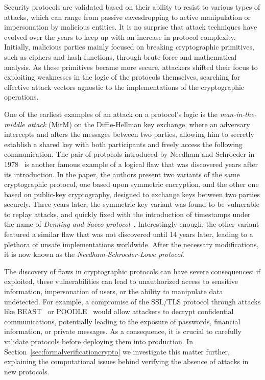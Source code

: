 Security protocols are validated based on their ability to resist to various types of attacks, which can range from passive eavesdropping to active manipulation or impersonation by malicious entities. It is no surprise that attack techniques have evolved over the years to keep up with an increase in protocol complexity. Initially, malicious parties mainly focused on breaking cryptographic primitives, such as ciphers and hash functions, through brute force and mathematical analysis. As these primitives became more secure, attackers shifted their focus to exploiting weaknesses in the logic of the protocols themselves, searching for effective attack vectors agnostic to the implementations of the cryptographic operations.

One of the earliest examples of an attack on a protocol's logic is the \textit{man-in-the-middle attack} (MitM) on the Diffie-Hellman key exchange, where an adversary intercepts and alters the messages between two parties, allowing him to secretly establish a shared key with both participants and freely access the following communication. The pair of protocols introduced by Needham and Schroeder in 1978~\cite{needhamschroeder} is another famous example of a logical flaw that was discovered years after its introduction. In the paper, the authors present two variants of the same cryptographic protocol, one based upon symmetric encryption, and the other one based on public-key cryptography, designed to exchange keys between two parties securely. Three years later, the symmetric key variant was found to be vulnerable to replay attacks, and quickly fixed with the introduction of timestamps under the name of \textit{Denning and Sacco protocol}~\cite{denningsacco}. Interestingly enough, the other variant featured a similar flaw that was not discovered until 14 years later, leading to a plethora of unsafe implementations worldwide. After the necessary modifications, it is now known as the \textit{Needham-Schroeder-Lowe protocol}.

The discovery of flaws in cryptographic protocols can have severe consequences: if exploited, these vulnerabilities can lead to unauthorized access to sensitive information, impersonation of users, or the ability to manipulate data undetected. For example, a compromise of the SSL/TLS protocol through attacks like BEAST~\cite{beast} or POODLE~\cite{poodle} would allow attackers to decrypt confidential communications, potentially leading to the exposure of passwords, financial information, or private messages. As a consequence, it is crucial to carefully validate protocols before deploying them into production. In Section~\ref{sec:formalverificationcrypto} we investigate this matter further, explaining the computational issues behind verifying the absence of attacks in new protocols.

